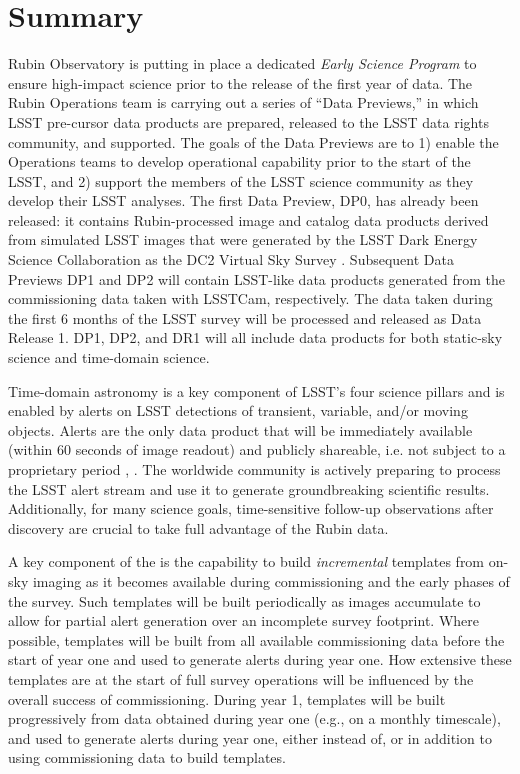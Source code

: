 \section{Summary}

Rubin Observatory is putting in place a dedicated {\it Early Science Program} to ensure high-impact science prior to the release of the first year of \lsst data.
The Rubin Operations team is carrying out a series of ``Data Previews,'' in which LSST pre-cursor data products are prepared, released to the LSST data rights community, and supported.
The goals of the Data Previews are to 1) enable the Operations teams to develop operational capability prior to the start of the LSST, and 2) support the members of the LSST science community as they develop their LSST analyses.
The first Data Preview, DP0, has already been released: it contains Rubin-processed image and catalog data products derived from simulated LSST images that were generated by the LSST Dark Energy Science Collaboration as the DC2 Virtual Sky Survey \citep{2021ApJS..253...31L}.
Subsequent Data Previews DP1 and DP2 will contain LSST-like data products generated from the commissioning data taken with LSSTCam, respectively.
The data taken during the first 6 months of the LSST survey will be processed and released as Data Release 1.
DP1, DP2, and DR1 will all include data products for both static-sky science and time-domain science.

Time-domain astronomy is a key component of LSST's four science pillars and is enabled by alerts on LSST detections of transient, variable, and/or moving objects.
Alerts are the only data product that will be immediately available (within 60 seconds of image readout) and publicly shareable, i.e. not subject to a proprietary period \citep{LSE-163},  \citep{RDO-013}.
The worldwide community is actively preparing to process the LSST alert stream and use it to generate groundbreaking scientific results. Additionally, for many science goals, time-sensitive follow-up observations after discovery are crucial to take full advantage of the Rubin data.

A key component of the \esp is the capability to build {\it incremental} templates from on-sky imaging as it becomes available during commissioning and the early phases of the survey.
Such templates will be built periodically as images accumulate to allow for partial alert generation over an incomplete survey footprint.
Where possible, templates will be built from all available commissioning data before the start of year one and used to generate alerts during year one.
How extensive these templates are at the start of full survey operations will be influenced by the overall success of commissioning.
During year 1, templates will be built progressively from data obtained during year one (e.g., on a monthly timescale), and used to generate alerts during year one, either instead of, or in addition to using commissioning data to build templates.
